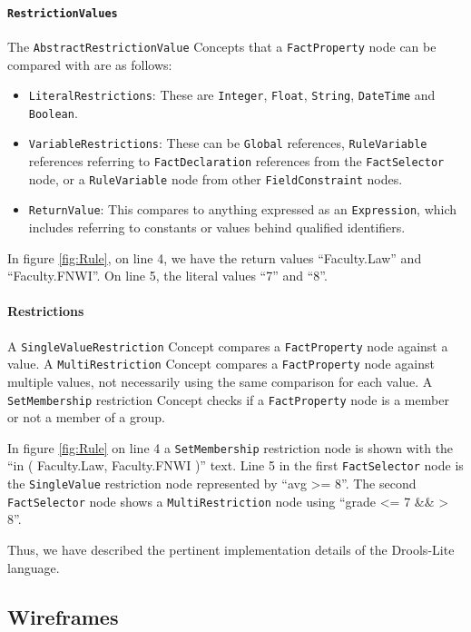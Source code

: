 \paragraph{\texttt{RestrictionValues}} The \texttt{AbstractRestrictionValue} Concepts that a \texttt{FactProperty} node can be compared with are as follows:
\begin{itemize}    
    \setlength\itemsep{0em}
    \item \texttt{LiteralRestrictions}: These are \texttt{Integer}, \texttt{Float}, \texttt{String}, \texttt{DateTime} and \texttt{Boolean}.
    \item \texttt{VariableRestrictions}: These can be \texttt{Global} references, \texttt{RuleVariable} references referring to \texttt{FactDeclaration} references from the \texttt{FactSelector} node, or a \texttt{RuleVariable} node from other \texttt{FieldConstraint} nodes.
    \item \texttt{ReturnValue}: This compares to anything expressed as an \texttt{Expression}, which includes referring to constants or values behind qualified identifiers.
\end{itemize}

In figure \ref{fig:Rule}, on line 4, we have the return values ``Faculty.Law'' and ``Faculty.FNWI''.
On line 5, the literal values ``7'' and ``8''.

\paragraph{Restrictions} A \texttt{SingleValueRestriction} Concept compares a \texttt{FactProperty} node against a value.
A \texttt{MultiRestriction} Concept compares a \texttt{FactProperty} node against multiple values, not necessarily using the same comparison for each value.
A \texttt{SetMembership} restriction Concept checks if a \texttt{FactProperty} node is a member or not a member of a group.

In figure \ref{fig:Rule} on line 4 a \texttt{SetMembership} restriction node is shown with the ``in ( Faculty.Law, Faculty.FNWI )'' text.
Line 5 in the first \texttt{FactSelector} node is the \texttt{SingleValue} restriction node represented by ``avg >= 8''.
The second \texttt{FactSelector} node shows a \texttt{MultiRestriction} node using ``grade <= 7 \&\& > 8''.

Thus, we have described the pertinent implementation details of the Drools-Lite language.

\subsection{Wireframes}

